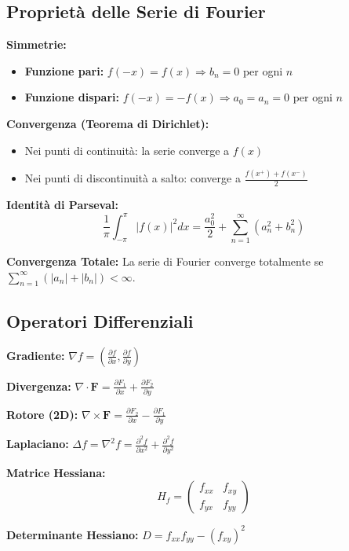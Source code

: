 \subsection{Proprietà delle Serie di Fourier}

\begin{info}
\textbf{Simmetrie:}
\begin{itemize}
    \item \textbf{Funzione pari:} $f(-x) = f(x) \Rightarrow b_n = 0$ per ogni $n$
    \item \textbf{Funzione dispari:} $f(-x) = -f(x) \Rightarrow a_0 = a_n = 0$ per ogni $n$
\end{itemize}

\textbf{Convergenza (Teorema di Dirichlet):}
\begin{itemize}
    \item Nei punti di continuità: la serie converge a $f(x)$
    \item Nei punti di discontinuità a salto: converge a $\frac{f(x^+) + f(x^-)}{2}$
\end{itemize}

\textbf{Identità di Parseval:}
\[ \frac{1}{\pi} \int_{-\pi}^{\pi} |f(x)|^2 dx = \frac{a_0^2}{2} + \sum_{n=1}^{\infty} (a_n^2 + b_n^2) \]

\textbf{Convergenza Totale:}
La serie di Fourier converge totalmente se $\sum_{n=1}^{\infty} (|a_n| + |b_n|) < \infty$.
\end{info}

\subsection{Operatori Differenziali}

\begin{info}
\textbf{Gradiente:} $\nabla f = \left(\frac{\partial f}{\partial x}, \frac{\partial f}{\partial y}\right)$

\textbf{Divergenza:} $\nabla \cdot \mathbf{F} = \frac{\partial F_1}{\partial x} + \frac{\partial F_2}{\partial y}$

\textbf{Rotore (2D):} $\nabla \times \mathbf{F} = \frac{\partial F_2}{\partial x} - \frac{\partial F_1}{\partial y}$

\textbf{Laplaciano:} $\Delta f = \nabla^2 f = \frac{\partial^2 f}{\partial x^2} + \frac{\partial^2 f}{\partial y^2}$

\textbf{Matrice Hessiana:}
\[ H_f = \begin{pmatrix} 
f_{xx} & f_{xy} \\ 
f_{yx} & f_{yy} 
\end{pmatrix} \]

\textbf{Determinante Hessiano:} $D = f_{xx}f_{yy} - (f_{xy})^2$
\end{info}

